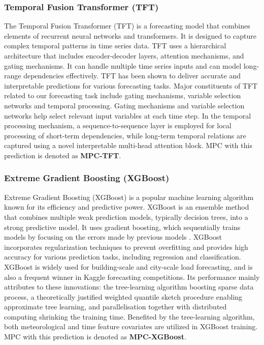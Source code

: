 \subsubsection{Temporal Fusion Transformer (TFT)}

The Temporal Fusion Transformer (TFT) is a forecasting model that combines elements of recurrent neural networks and transformers. It is designed to capture complex temporal patterns in time series data. TFT uses a hierarchical architecture that includes encoder-decoder layers, attention mechanisms, and gating mechanisms. It can handle multiple time series inputs and can model long-range dependencies effectively. TFT has been shown to deliver accurate and interpretable predictions for various forecasting tasks\cite{TFT}. Major constituents of TFT related to our forecasting task include gating mechanisms, variable selection networks and temporal processing. Gating mechanisms and variable selection networks help select relevant input variables at each time step. In the temporal processing mechanism, a sequence-to-sequence layer is employed for local processing of short-term dependencies, while long-term temporal relations are captured using a novel interpretable multi-head attention block.  MPC with this prediction is denoted as \textbf{MPC-TFT}.

\subsubsection{Extreme Gradient Boosting (XGBoost)}

Extreme Gradient Boosting (XGBoost) is a popular machine learning algorithm known for its efficiency and predictive power. XGBoost is an ensemble method that combines multiple weak prediction models, typically decision trees, into a strong predictive model. It uses gradient boosting, which sequentially trains models by focusing on the errors made by previous models \cite{XGBoost}. XGBoost incorporates regularization techniques to prevent overfitting and provides high accuracy for various prediction tasks, including regression and classification. XGBoost is widely used for building-scale\cite{wang2020building} and city-scale\cite{wang2021predicting} load forecasting, and is also a frequent winner in Kaggle forecasting competitions\cite{Kaggle}. Its performance mainly attributes to these innovations: the tree-learning algorithm boosting sparse data process, a theoretically justified weighted quantile sketch procedure enabling approximate tree learning, and parallelisation together with distributed computing shrinking the training time. Benefited by the tree-learning algorithm, both meteorological and time feature covariates are utilized in XGBoost training. MPC with this prediction is denoted as \textbf{MPC-XGBoost}.

